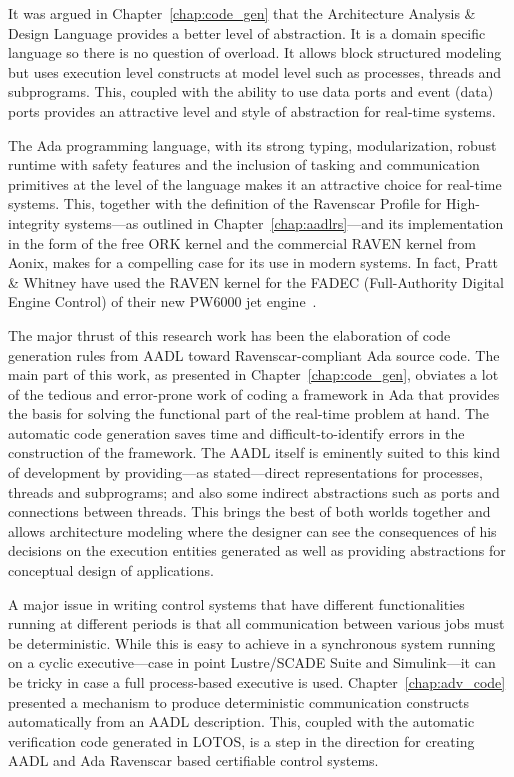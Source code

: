 It was argued in Chapter~\ref{chap:code_gen} that the Architecture
Analysis \& Design Language provides a better level of abstraction. It
is a domain specific language so there is no question of overload. It
allows block structured modeling but uses execution level constructs
at model level such as processes, threads and subprograms. This,
coupled with the ability to use data ports and event (data) ports
provides an attractive level and style of abstraction for real-time
systems.

The Ada programming language, with its strong typing, modularization,
robust runtime with safety features and the inclusion of tasking and
communication primitives at the level of the language makes it an
attractive choice for real-time systems. This, together with the
definition of the Ravenscar Profile for High-integrity systems---as
outlined in Chapter~\ref{chap:aadlrs}---and its implementation in the
form of the free ORK kernel and the commercial RAVEN kernel from
Aonix, makes for a compelling case for its use in modern systems. In
fact, Pratt \& Whitney have used the RAVEN kernel for the FADEC
(Full-Authority Digital Engine Control) of their new PW6000 jet
engine~\cite{raven-fadec}.

The major thrust of this research work has been the elaboration of
code generation rules from AADL toward Ravenscar-compliant Ada source
code. The main part of this work, as presented in
Chapter~\ref{chap:code_gen}, obviates a lot of the tedious and
error-prone work of coding a framework in Ada that provides the basis
for solving the functional part of the real-time problem at hand. The
automatic code generation saves time and difficult-to-identify errors
in the construction of the framework. The AADL itself is eminently
suited to this kind of development by providing---as stated---direct
representations for processes, threads and subprograms; and also some
indirect abstractions such as ports and connections between
threads. This brings the best of both worlds together and allows
architecture modeling where the designer can see the consequences of
his decisions on the execution entities generated as well as providing
abstractions for conceptual design of applications.

A major issue in writing control systems that have different
functionalities running at different periods is that all communication
between various jobs must be deterministic. While this is easy to
achieve in a synchronous system running on a cyclic executive---case
in point Lustre/SCADE Suite and Simulink---it can be tricky in case a
full process-based executive is used. Chapter~\ref{chap:adv_code}
presented a mechanism to produce deterministic communication
constructs automatically from an AADL description. This, coupled with
the automatic verification code generated in LOTOS, is a step in the
direction for creating AADL and Ada Ravenscar based certifiable
control systems.

